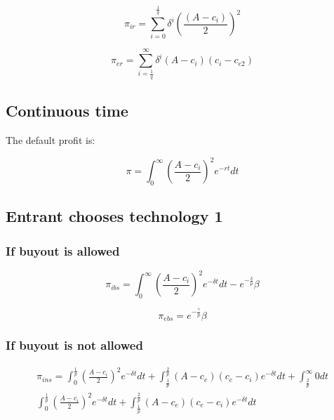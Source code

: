 \documentclass{article}
\begin{document}
\begin{equation*}
\pi_{ir} = \sum^{\frac{1}{q}}_{i=0} \delta^i \left(\frac{(A-c_i)}{2} \right)^2 
\end{equation*}

\begin{equation*}
\pi_{er} = \sum^{\infty}_{i=\frac{1}{q}} \delta^i (A-c_i)(c_i-c_{e2}) 
\end{equation*}

\subsection{Continuous time}

The default profit is:

\begin{equation*}
\pi = \int^{\infty}_0 \left(\frac{A-c_i}{2} \right)^2 e^{-rt}dt
\end{equation*}

\subsection*{Entrant chooses technology 1}

\subsubsection{If buyout is allowed}

\begin{equation*}
\pi_{ibs} = \int^{\infty}_0 \left(\frac{A-c_i}{2} \right)^2 e^{-\delta t}dt - e^{-\frac{\delta}{p}} \beta
\end{equation*}

\begin{equation*}
\pi_{ebs} = e^{-\frac{\gamma}{p}} \beta
\end{equation*}

\subsubsection{If buyout is not allowed}

\begin{align*}
\pi_{ins}= \int^{\frac{1}{p}}_0 \left(\frac{A-c_i}{2} \right)^2 e^{-\delta t}dt 
+ \int^{\frac{2}{p}}_{\frac{1}{p}} (A-c_e)(c_e-c_i)  e^{-\delta t}dt
+ \int^{\infty}_{\frac{2}{p}} 0 dt \\
\int^{\frac{1}{p}}_0 \left(\frac{A-c_i}{2} \right)^2 e^{-\delta t}dt 
+ \int^{\frac{2}{p}}_{\frac{1}{p}} (A-c_e)(c_e-c_i) e^{-\delta t}dt
\end{align*}
\end{document}
